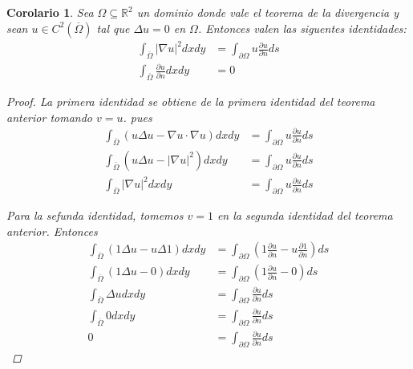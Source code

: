 \documentclass[11pt]{book}
\theoremstyle{plain}
\newtheorem{coro}[proposición]{Corolario}
\theoremstyle{definition}
\newcommand{\R}{\mathbb{R}}
\begin{document}
    \begin{coro}
        Sea $\Omega \subseteq \R^{2}$ un dominio donde vale el teorema de la divergencia y sean $u \in C^{2}(\overline{\Omega})$ tal que $\Delta u = 0$ en $\Omega$. Entonces valen las siguentes identidades:
        \begin{align*}
            \int_{\overline{\Omega}} |\nabla u|^{2}dxdy &= \int_{\partial \Omega} u \frac{\partial u}{\partial n}ds\\
            \int_{\overline{\Omega}} \frac{\partial u}{\partial n}dxdy &= 0
        \end{align*}
        \begin{proof}
            La primera identidad se obtiene de la primera identidad del teorema anterior tomando $v = u$. pues
            \begin{align*}
                \int_{\overline{\Omega}} \left(u \Delta u - \nabla u \cdot \nabla u\right)dxdy &= \int_{\partial \Omega} u \frac{\partial u}{\partial n}ds\\
                \int_{\overline{\Omega}} \left(u \Delta u - |\nabla u|^{2}\right)dxdy &= \int_{\partial \Omega} u \frac{\partial u}{\partial n}ds\\
                \int_{\overline{\Omega}} |\nabla u|^{2}dxdy &= \int_{\partial \Omega} u \frac{\partial u}{\partial n}ds
            \end{align*}

            Para la sefunda identidad, tomemos $v = 1$ en la segunda identidad del teorema anterior. Entonces
            \begin{align*}
                \int_{\overline{\Omega}} \left(1 \Delta u - u \Delta 1\right)dxdy &= \int_{\partial \Omega} \left(1 \frac{\partial u}{\partial n} - u \frac{\partial 1}{\partial n}\right)ds\\
                \int_{\overline{\Omega}} \left(1 \Delta u - 0\right)dxdy &= \int_{\partial \Omega} \left(1 \frac{\partial u}{\partial n} - 0\right)ds\\
                \int_{\overline{\Omega}} \Delta u dxdy &= \int_{\partial \Omega} \frac{\partial u}{\partial n}ds\\
                \int_{\overline{\Omega}} 0 dxdy &= \int_{\partial \Omega} \frac{\partial u}{\partial n}ds\\
                0 &= \int_{\partial \Omega} \frac{\partial u}{\partial n}ds
            \end{align*}
        \end{proof}        
    \end{coro}
\end{document}
